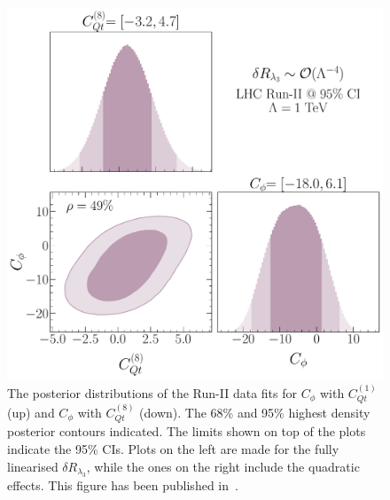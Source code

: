\begin{figure}[h!]
\begin{center}
			\includegraphics[width=0.45\linewidth]{fig/Cqt8_LHC_RunII_quadl3_rge} 
		\end{center}
		\caption{The posterior distributions of the Run-II data fits for $C_\phi$ with $C_{Qt}^{(1)}$ (up) and $C_\phi$ with $C_{Qt}^{(8)}$ (down). The 68\% and 95\% highest density posterior contours indicated. The limits shown on top of the plots indicate the 95\% CIs. Plots on the left are made for the fully linearised  $\delta R_{\lambda_3}$, while the ones on the right include the quadratic effects. This figure has been published in~\cite{Alasfar:2022zyr}. \label{2param-cqt}   }
	\end{figure}
	
